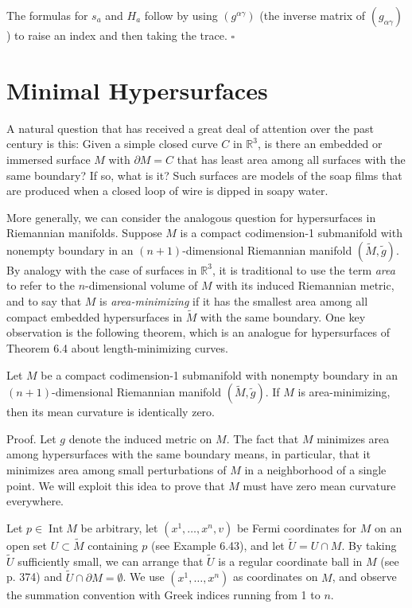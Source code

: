 The formulas for $s_a$ and $H_a$ follow by using $(g^{\alpha\gamma})$ (the inverse matrix of $(g_{\alpha\gamma})$) to raise an index and then taking the trace. $\square$

\section{Minimal Hypersurfaces}

A natural question that has received a great deal of attention over the past century is this: Given a simple closed curve $C$ in $\mathbb{R}^3$, is there an embedded or immersed surface $M$ with $\partial M = C$ that has least area among all surfaces with the same boundary? If so, what is it? Such surfaces are models of the soap films that are produced when a closed loop of wire is dipped in soapy water.

More generally, we can consider the analogous question for hypersurfaces in Riemannian manifolds. Suppose $M$ is a compact codimension-1 submanifold with nonempty boundary in an $(n+1)$-dimensional Riemannian manifold $(\tilde{M}, \tilde{g})$. By analogy with the case of surfaces in $\mathbb{R}^3$, it is traditional to use the term \emph{area} to refer to the $n$-dimensional volume of $M$ with its induced Riemannian metric, and to say that $M$ is \emph{area-minimizing} if it has the smallest area among all compact embedded hypersurfaces in $\tilde{M}$ with the same boundary. One key observation is the following theorem, which is an analogue for hypersurfaces of Theorem 6.4 about length-minimizing curves.

\begin{theorem}
\label{thm:area-minimizing-zero-mean-curvature}
Let $M$ be a compact codimension-1 submanifold with nonempty boundary in an $(n+1)$-dimensional Riemannian manifold $(\tilde{M}, \tilde{g})$. If $M$ is area-minimizing, then its mean curvature is identically zero.
\end{theorem}

Proof. Let $g$ denote the induced metric on $M$. The fact that $M$ minimizes area among hypersurfaces with the same boundary means, in particular, that it minimizes area among small perturbations of $M$ in a neighborhood of a single point. We will exploit this idea to prove that $M$ must have zero mean curvature everywhere.

Let $p \in \operatorname{Int} M$ be arbitrary, let $(x^1,\ldots,x^n,v)$ be Fermi coordinates for $M$ on an open set $U \subset \tilde{M}$ containing $p$ (see Example 6.43), and let $\tilde{U} = U \cap M$. By taking $\tilde{U}$ sufficiently small, we can arrange that $\tilde{U}$ is a regular coordinate ball in $M$ (see p. 374) and $\tilde{U} \cap \partial M = \emptyset$. We use $(x^1, \ldots, x^n)$ as coordinates on $M$, and observe the summation convention with Greek indices running from 1 to $n$.

